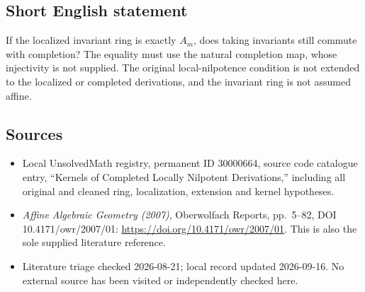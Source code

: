 \documentclass[11pt]{article}
\begin{document}
\subsection{Short English statement}
If the localized invariant ring is exactly \(A_m\), does taking invariants still commute with completion? The equality must use the natural completion map, whose injectivity is not supplied. The original local-nilpotence condition is not extended to the localized or completed derivations, and the invariant ring is not assumed affine.
\subsection{Sources}
\begin{itemize}
\item Local UnsolvedMath registry, permanent ID 30000664, source code catalogue entry, ``Kernels of Completed Locally Nilpotent Derivations,'' including all original and cleaned ring, localization, extension and kernel hypotheses.
\item \emph{Affine Algebraic Geometry (2007)}, Oberwolfach Reports, pp.\ 5--82, DOI 10.4171/owr/2007/01: \url{https://doi.org/10.4171/owr/2007/01}. This is also the sole supplied literature reference.
\item Literature triage checked 2026-08-21; local record updated 2026-09-16. No external source has been visited or independently checked here.
\end{itemize}
\end{document}

